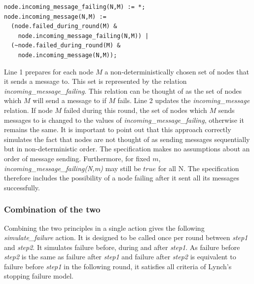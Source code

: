 \documentclass[fleqn]{article}
\begin{document}
\begin{mdframed}[nobreak=true, backgroundcolor=light-gray, roundcorner=10pt,leftmargin=1, rightmargin=1, innerleftmargin=15, innertopmargin=15,innerbottommargin=15, outerlinewidth=1, linecolor=light-gray]
\begin{lstlisting}
node.incoming_message_failing(N,M) := *;
node.incoming_message(N,M) :=
  (node.failed_during_round(M) &
    node.incoming_message_failing(N,M)) |
  (~node.failed_during_round(M) &
    node.incoming_message(N,M));
\end{lstlisting}
\end{mdframed}

Line 1 prepares for each node $M$ a non-deterministically chosen set of nodes that it sends a message to. This set is represented by the relation \textit{incoming\_message\_failing}. This relation can be thought of as the set of nodes which $M$ will send a message to if $M$ fails.
Line 2 updates the \textit{incoming\_message} relation. If node $M$ failed during this round, the set of nodes which
 $M$ sends messages to is changed to the values of \textit{incoming\_message\_failing}, otherwise it remains the same. It is important to point out that this approach correctly simulates the fact that nodes are not thought of as sending messages sequentially but in non-deterministic order. The specification makes no assumptions about an order of message sending. Furthermore, for fixed $m$, \textit{incoming\_message\_failing(N,m)} may still be $true$ for all N. The specification therefore includes the possibility of a node failing after it sent all its messages successfully.

\subsubsection{Combination of the two}
Combining the two principles in a single action gives the following \textit{simulate\_failure} action. It is designed to be called once per round between \textit{step1} and \textit{step2}. It simulates failure before, during and after \textit{step1}. As failure before \textit{step2} is the same as failure after \textit{step1} and failure after \textit{step2} is equivalent to failure before \textit{step1} in the following round, it satisfies all criteria of Lynch's \cite{refNancy} stopping failure model.
\end{document}
